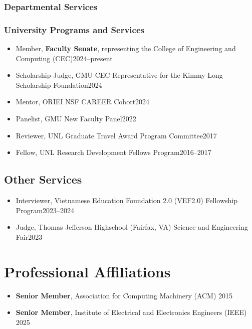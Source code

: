 \documentclass[11pt]{article}
\newcommand{\beforegmu}{\begin{center}\rule{2in}{0.8pt}~\textbf{Before GMU}~\rule{2in}{0.8pt}\end{center}}
\begin{document}
\subsubsection{Departmental Services}

\myunitservices{}


\subsubsection{University Programs and Services}
\begin{itemize}
    \item Member, \textbf{Faculty Senate}, representing the College of Engineering and Computing (CEC)\hfill 2024--present
    \item Scholarship Judge, GMU CEC Representative for the Kimmy Long Scholarship Foundation\hfill 2024
    \item Mentor, ORIEI NSF CAREER Cohort\hfill 2024
    \item Panelist, GMU New Faculty Panel\hfill 2022
    \item Reviewer,  UNL Graduate Travel Award Program Committee\hfill 2017
    \item Fellow, UNL Research Development Fellows Program\hfill 2016--2017
\end{itemize}


\subsection{Other Services}
\begin{itemize}
    \item  Interviewer, Vietnamese Education Foundation 2.0 (VEF2.0) Fellowship Program\hfill 2023--2024
    \item Judge, Thomas Jefferson Highschool (Fairfax, VA) Science and Engineering Fair\hfill 2023
\end{itemize}

\section{Professional Affiliations}
\begin{itemize}
    \item \textbf{Senior Member},  Association for Computing Machinery (ACM) \hfill  2015
    \item \textbf{Senior Member}, Institute of Electrical and Electronics Engineers (IEEE) \hfill 2025
\end{itemize}
\end{document}
